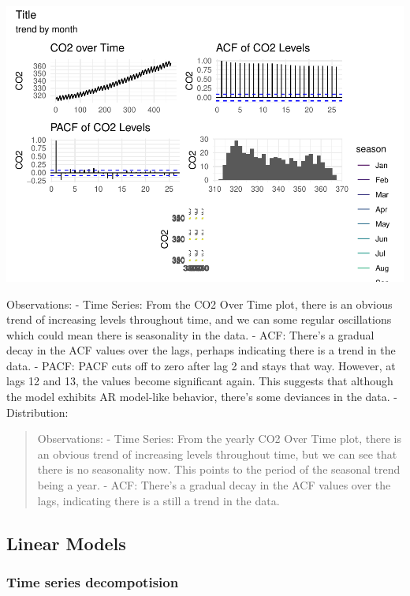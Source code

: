 \documentclass[AER]{AEA}
\begin{document}
\includegraphics{Lab2_Group_report_files/figure-latex/EDA -1.pdf}

Observations: - Time Series: From the CO2 Over Time plot, there is an
obvious trend of increasing levels throughout time, and we can some
regular oscillations which could mean there is seasonality in the data.
- ACF: There's a gradual decay in the ACF values over the lags, perhaps
indicating there is a trend in the data. - PACF: PACF cuts off to zero
after lag 2 and stays that way. However, at lags 12 and 13, the values
become significant again. This suggests that although the model exhibits
AR model-like behavior, there's some deviances in the data. -
Distribution:

\begin{quote}
Observations: - Time Series: From the yearly CO2 Over Time plot, there
is an obvious trend of increasing levels throughout time, but we can see
that there is no seasonality now. This points to the period of the
seasonal trend being a year. - ACF: There's a gradual decay in the ACF
values over the lags, indicating there is a still a trend in the data.
\end{quote}

\hypertarget{linear-models}{%
\subsection{Linear Models}\label{linear-models}}

\hypertarget{time-series-decompotision}{%
\subsubsection{Time series
decompotision}\label{time-series-decompotision}}
\end{document}

